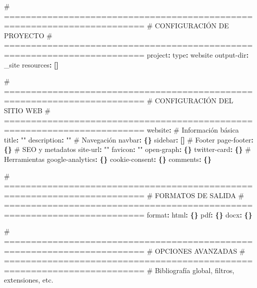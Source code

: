 \documentclass[
  doc,
  floatsintext,
  longtable,
  a4paper,
  nolmodern,
  notxfonts,
  notimes,
  12pt,
  colorlinks=true,linkcolor=blue,citecolor=blue,urlcolor=blue]{apa7}
\newenvironment{Shaded}{\begin{snugshade}}{\end{snugshade}}
\newcommand{\AttributeTok}[1]{\textcolor[rgb]{0.40,0.45,0.13}{#1}}
\newcommand{\CommentTok}[1]{\textcolor[rgb]{0.37,0.37,0.37}{#1}}
\newcommand{\FunctionTok}[1]{\textcolor[rgb]{0.28,0.35,0.67}{#1}}
\newcommand{\KeywordTok}[1]{\textcolor[rgb]{0.00,0.23,0.31}{\textbf{#1}}}
\newcommand{\StringTok}[1]{\textcolor[rgb]{0.13,0.47,0.30}{#1}}
\begin{document}
\begin{Shaded}
\begin{Highlighting}[]
\CommentTok{\# ========================================================================}
\CommentTok{\# CONFIGURACIÓN DE PROYECTO}
\CommentTok{\# ========================================================================}
\FunctionTok{project}\KeywordTok{:}
\AttributeTok{  }\FunctionTok{type}\KeywordTok{:}\AttributeTok{ website}
\AttributeTok{  }\FunctionTok{output{-}dir}\KeywordTok{:}\AttributeTok{ \_site}
\AttributeTok{  }\FunctionTok{resources}\KeywordTok{:}\AttributeTok{ }\KeywordTok{[]}

\CommentTok{\# ========================================================================}
\CommentTok{\# CONFIGURACIÓN DEL SITIO WEB}
\CommentTok{\# ========================================================================}
\FunctionTok{website}\KeywordTok{:}
\CommentTok{  \# Información básica}
\AttributeTok{  }\FunctionTok{title}\KeywordTok{:}\AttributeTok{ }\StringTok{""}
\AttributeTok{  }\FunctionTok{description}\KeywordTok{:}\AttributeTok{ }\StringTok{""}
\AttributeTok{  }
\CommentTok{  \# Navegación}
\AttributeTok{  }\FunctionTok{navbar}\KeywordTok{:}\AttributeTok{ }\KeywordTok{\{\}}
\AttributeTok{  }\FunctionTok{sidebar}\KeywordTok{:}\AttributeTok{ }\KeywordTok{[]}
\AttributeTok{  }
\CommentTok{  \# Footer}
\AttributeTok{  }\FunctionTok{page{-}footer}\KeywordTok{:}\AttributeTok{ }\KeywordTok{\{\}}
\AttributeTok{  }
\CommentTok{  \# SEO y metadatos}
\AttributeTok{  }\FunctionTok{site{-}url}\KeywordTok{:}\AttributeTok{ }\StringTok{""}
\AttributeTok{  }\FunctionTok{favicon}\KeywordTok{:}\AttributeTok{ }\StringTok{""}
\AttributeTok{  }\FunctionTok{open{-}graph}\KeywordTok{:}\AttributeTok{ }\KeywordTok{\{\}}
\AttributeTok{  }\FunctionTok{twitter{-}card}\KeywordTok{:}\AttributeTok{ }\KeywordTok{\{\}}
\AttributeTok{  }
\CommentTok{  \# Herramientas}
\AttributeTok{  }\FunctionTok{google{-}analytics}\KeywordTok{:}\AttributeTok{ }\KeywordTok{\{\}}
\AttributeTok{  }\FunctionTok{cookie{-}consent}\KeywordTok{:}\AttributeTok{ }\KeywordTok{\{\}}
\AttributeTok{  }\FunctionTok{comments}\KeywordTok{:}\AttributeTok{ }\KeywordTok{\{\}}

\CommentTok{\# ========================================================================}
\CommentTok{\# FORMATOS DE SALIDA}
\CommentTok{\# ========================================================================}
\FunctionTok{format}\KeywordTok{:}
\AttributeTok{  }\FunctionTok{html}\KeywordTok{:}\AttributeTok{ }\KeywordTok{\{\}}
\AttributeTok{  }\FunctionTok{pdf}\KeywordTok{:}\AttributeTok{ }\KeywordTok{\{\}}
\AttributeTok{  }\FunctionTok{docx}\KeywordTok{:}\AttributeTok{ }\KeywordTok{\{\}}

\CommentTok{\# ========================================================================}
\CommentTok{\# OPCIONES AVANZADAS}
\CommentTok{\# ========================================================================}
\CommentTok{\# Bibliografía global, filtros, extensiones, etc.}
\end{Highlighting}
\end{Shaded}
\end{document}
